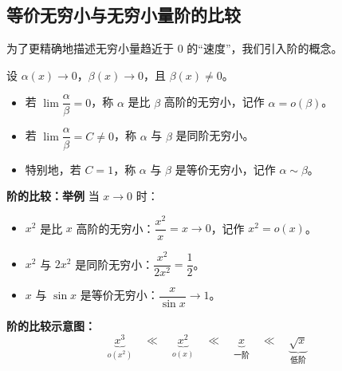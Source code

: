 \documentclass[fontset=fandol]{ctexart}
\newenvironment{custom}[1]{\par\noindent\textbf{#1}\quad}{\par\vspace{0.8em}}
\begin{document}
\subsection{等价无穷小与无穷小量阶的比较}

为了更精确地描述无穷小量趋近于 0 的“速度”，我们引入阶的概念。

\begin{definition}[无穷小的阶]
设 \(\alpha(x) \to 0\)，\(\beta(x) \to 0\)，且 \(\beta(x) \neq 0\)。
\begin{itemize}
\item 若 \(\lim \dfrac{\alpha}{\beta} = 0\)，称 \(\alpha\) 是比 \(\beta\) 高阶的无穷小，记作 \(\alpha = o(\beta)\)。
\item 若 \(\lim \dfrac{\alpha}{\beta} = C \neq 0\)，称 \(\alpha\) 与 \(\beta\) 是同阶无穷小。
\item 特别地，若 \(C = 1\)，称 \(\alpha\) 与 \(\beta\) 是等价无穷小，记作 \(\alpha \sim \beta\)。
\end{itemize}
\end{definition}

\begin{custom}{阶的比较：举例}
当 \(x \to 0\) 时：
\begin{itemize}
\item \(x^2\) 是比 \(x\) 高阶的无穷小：\(\dfrac{x^2}{x} = x \to 0\)，记作 \(x^2 = o(x)\)。
\item \(x^2\) 与 \(2x^2\) 是同阶无穷小：\(\dfrac{x^2}{2x^2} = \dfrac{1}{2}\)。
\item \(x\) 与 \(\sin x\) 是等价无穷小：\(\dfrac{x}{\sin x} \to 1\)。
\end{itemize}

\textbf{阶的比较示意图：}
\[
\underbrace{x^3}_{o(x^2)} \quad \ll \quad \underbrace{x^2}_{o(x)} \quad \ll \quad \underbrace{x}_{\text{一阶}} \quad \ll \quad \underbrace{\sqrt{x}}_{\text{低阶}}
\]
\end{custom}
\end{document}
